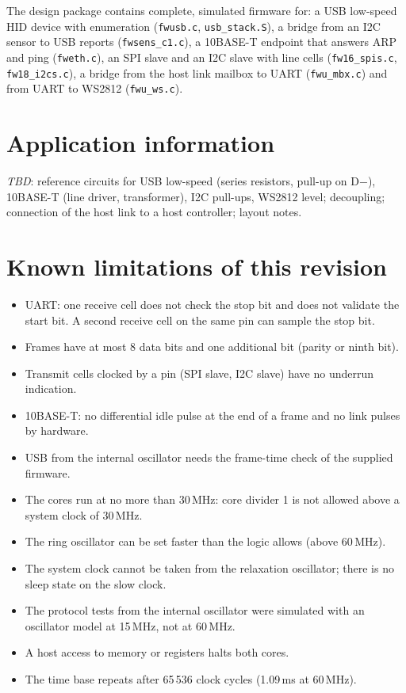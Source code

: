 \documentclass[10pt,a4paper]{article}
\newcommand{\tbd}{\textcolor{black!50}{\textit{TBD}}}
\begin{document}
The design package contains complete, simulated firmware for: a USB low-speed HID device with enumeration
(\texttt{fwusb.c}, \texttt{usb\_stack.S}), a bridge from an I2C sensor to USB reports (\texttt{fwsens\_c1.c}), a
10BASE-T endpoint that answers ARP and ping (\texttt{fweth.c}), an SPI slave and an I2C slave with line cells
(\texttt{fw16\_spis.c}, \texttt{fw18\_i2cs.c}), a bridge from the host link mailbox to UART (\texttt{fwu\_mbx.c}) and
from UART to WS2812 (\texttt{fwu\_ws.c}).

\section{Application information}

\tbd: reference circuits for USB low-speed (series resistors, pull-up on D$-$), 10BASE-T (line driver,
transformer), I2C pull-ups, WS2812 level; decoupling; connection of the host link to a host controller;
layout notes.

\section{Known limitations of this revision}

\begin{itemize}
\item UART: one receive cell does not check the stop bit and does not validate the start bit. A second receive
cell on the same pin can sample the stop bit.
\item Frames have at most 8 data bits and one additional bit (parity or ninth bit).
\item Transmit cells clocked by a pin (SPI slave, I2C slave) have no underrun indication.
\item 10BASE-T: no differential idle pulse at the end of a frame and no link pulses by hardware.
\item USB from the internal oscillator needs the frame-time check of the supplied firmware.
\item The cores run at no more than 30\,MHz: core divider 1 is not allowed above a system clock of 30\,MHz.
\item The ring oscillator can be set faster than the logic allows (above 60\,MHz).
\item The system clock cannot be taken from the relaxation oscillator; there is no sleep state on the slow clock.
\item The protocol tests from the internal oscillator were simulated with an oscillator model at 15\,MHz, not at 60\,MHz.
\item A host access to memory or registers halts both cores.
\item The time base repeats after 65\,536 clock cycles (1.09\,ms at 60\,MHz).
\end{itemize}
\end{document}
